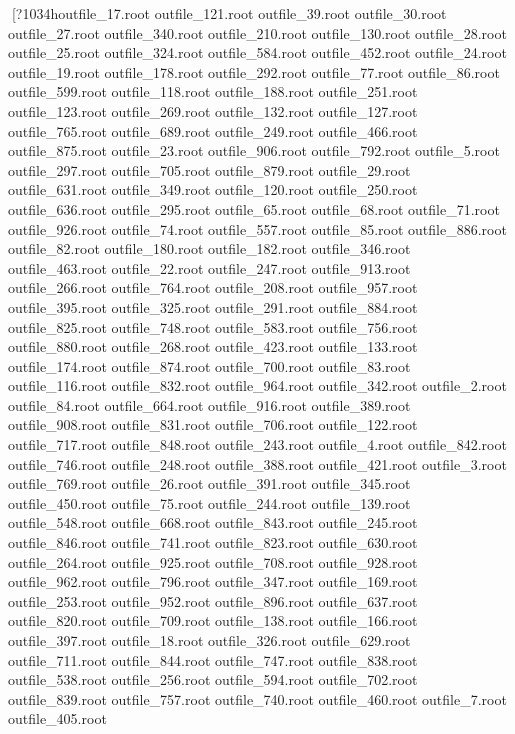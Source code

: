 [?1034houtfile_17.root
outfile_121.root
outfile_39.root
outfile_30.root
outfile_27.root
outfile_340.root
outfile_210.root
outfile_130.root
outfile_28.root
outfile_25.root
outfile_324.root
outfile_584.root
outfile_452.root
outfile_24.root
outfile_19.root
outfile_178.root
outfile_292.root
outfile_77.root
outfile_86.root
outfile_599.root
outfile_118.root
outfile_188.root
outfile_251.root
outfile_123.root
outfile_269.root
outfile_132.root
outfile_127.root
outfile_765.root
outfile_689.root
outfile_249.root
outfile_466.root
outfile_875.root
outfile_23.root
outfile_906.root
outfile_792.root
outfile_5.root
outfile_297.root
outfile_705.root
outfile_879.root
outfile_29.root
outfile_631.root
outfile_349.root
outfile_120.root
outfile_250.root
outfile_636.root
outfile_295.root
outfile_65.root
outfile_68.root
outfile_71.root
outfile_926.root
outfile_74.root
outfile_557.root
outfile_85.root
outfile_886.root
outfile_82.root
outfile_180.root
outfile_182.root
outfile_346.root
outfile_463.root
outfile_22.root
outfile_247.root
outfile_913.root
outfile_266.root
outfile_764.root
outfile_208.root
outfile_957.root
outfile_395.root
outfile_325.root
outfile_291.root
outfile_884.root
outfile_825.root
outfile_748.root
outfile_583.root
outfile_756.root
outfile_880.root
outfile_268.root
outfile_423.root
outfile_133.root
outfile_174.root
outfile_874.root
outfile_700.root
outfile_83.root
outfile_116.root
outfile_832.root
outfile_964.root
outfile_342.root
outfile_2.root
outfile_84.root
outfile_664.root
outfile_916.root
outfile_389.root
outfile_908.root
outfile_831.root
outfile_706.root
outfile_122.root
outfile_717.root
outfile_848.root
outfile_243.root
outfile_4.root
outfile_842.root
outfile_746.root
outfile_248.root
outfile_388.root
outfile_421.root
outfile_3.root
outfile_769.root
outfile_26.root
outfile_391.root
outfile_345.root
outfile_450.root
outfile_75.root
outfile_244.root
outfile_139.root
outfile_548.root
outfile_668.root
outfile_843.root
outfile_245.root
outfile_846.root
outfile_741.root
outfile_823.root
outfile_630.root
outfile_264.root
outfile_925.root
outfile_708.root
outfile_928.root
outfile_962.root
outfile_796.root
outfile_347.root
outfile_169.root
outfile_253.root
outfile_952.root
outfile_896.root
outfile_637.root
outfile_820.root
outfile_709.root
outfile_138.root
outfile_166.root
outfile_397.root
outfile_18.root
outfile_326.root
outfile_629.root
outfile_711.root
outfile_844.root
outfile_747.root
outfile_838.root
outfile_538.root
outfile_256.root
outfile_594.root
outfile_702.root
outfile_839.root
outfile_757.root
outfile_740.root
outfile_460.root
outfile_7.root
outfile_405.root
